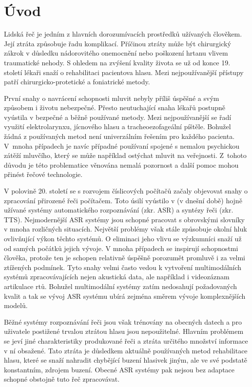 \chapter{Úvod}
\label{chap:introduction}

Lidská řeč je jedním z hlavních dorozumívacích prostředků užívaných člověkem.
Její ztráta způsobuje řadu komplikací. Příčinou ztráty může být chirurgický zákrok v důsledku nádorovitého onemocnění nebo
poškození hrtanu vlivem traumatické nehody. S ohledem na zvýšení kvality
života se už od konce 19. století lékaři snaží o rehabilitaci pacientova hlasu.
Mezi nejpoužívanější přístupy patří chirurgicko-protetické a foniatrické metody.

První snahy o navrácení schopnosti mluvit nebyly příliš úspěšné a svým
způsobem i životu nebezpečné. Přesto neutuchající snaha lékařů postupně
vyústila v bezpečné a běžně používané metody. Mezi nejpoužívanější se řadí
využití elektrolarynxu, jícnového hlasu a tracheoezofageální píštěle. Bohužel
žádná z používaných metod není univerzálním řešením pro každého pacienta.
V~mnoha případech je navíc případné používaní spojené s nemalou psychickou
zátěží mluvčího, který se může například ostýchat mluvit na veřejnosti.
Z~tohoto důvodu je této problematice věnována nemalá pozornost a další pomoc
mohou přinést řečové technologie.

V polovině 20. století se s rozvojem číslicových počítačů začaly objevovat
snahy o zpracování přirozené řeči počítačem. Toto úsilí vyústilo v (v dnešní
době) hojně užívané systémy automatického rozpoznávání (zkr. ASR) a syntézy
řeči (zkr. TTS). Nejmodernější ASR systémy jsou schopné pracovat s obrovskými
slovníky v mnoha rozličných situacích. Největší problémy však stále způsobuje
okolní hluk ovlivňující výkon těchto systémů. O eliminaci jeho vlivu se
výzkumníci snaží už od samých počátků jejich vývoje. V mnoha případech se
inspirují schopnostmi člověka, protože ten je schopen relativně úspěšně
porozumět promluvě i za velmi ztížených podmínek. Tyto snahy velmi často vedou
k vytvoření multimodálních systémů zpracovávajících nejen akustická data, ale
například i videozáznam artikulace rtů. Bohužel multimodální systémy zatím nedosahují požadovaných kvalit a tak se vývoj ASR systému ubírá zejména směrem vývoje komplexnějších modelů.

Běžné systémy rozpoznávání řeči jsou však trénovány na obecných datech a pro uživatele postižené trvalou ztrátou hlasu jsou nepoužitelné. Hlavním problémem se jeví jiné charakteristiky produkované řeči a ztráta určitého množství informace v ní obsažené. Tato ztráta je důsledkem aktuálně používaných metod rehabilitace hlasu, které se snaží nahradit chybějící buzení hlasivek jiným, ale ve své podstatě konstantním, zdrojem buzení. Obecné ASR systémy pak nejsou bez adaptace schopné obstojně tuto řeč zpracovávat.

